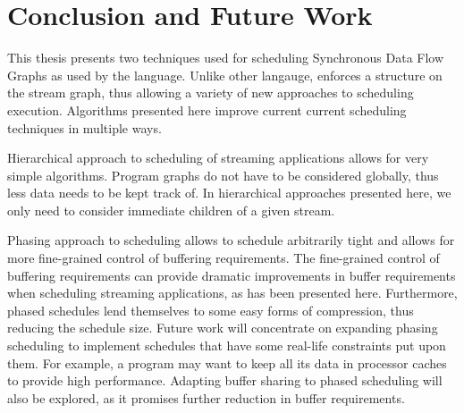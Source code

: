 \section{Conclusion and Future Work}

This thesis presents two techniques used for scheduling
Synchronous Data Flow Graphs as used by the {\StreamIt} language.
Unlike other langauge, {\StreamIt} enforces a structure on the
stream graph, thus allowing a variety of new approaches to
scheduling execution. Algorithms presented here improve current
current scheduling techniques in multiple ways.

Hierarchical approach to scheduling of streaming applications
allows for very simple algorithms. Program graphs do not have to
be considered globally, thus less data needs to be kept track of.
In hierarchical approaches presented here, we only need to
consider immediate children of a given stream.

Phasing approach to scheduling allows to schedule arbitrarily
tight {\feedbackloops} and allows for more fine-grained control of
buffering requirements. The fine-grained control of buffering
requirements can provide dramatic improvements in buffer
requirements when scheduling streaming applications, as has been
presented here. Furthermore, phased schedules lend themselves to
some easy forms of compression, thus reducing the schedule size.
Future work will concentrate on expanding phasing scheduling to
implement schedules that have some real-life constraints put upon
them. For example, a program may want to keep all its data in
processor caches to provide high performance. Adapting buffer
sharing to phased scheduling will also be explored, as it promises
further reduction in buffer requirements.

